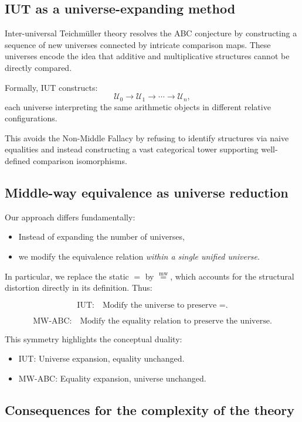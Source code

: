 \documentclass[11pt]{article}
\newcommand{\mweq}{\mathrel{\overset{\mathrm{mw}}{=}}}
\theoremstyle{definition}
\theoremstyle{remark}
\begin{document}
\subsection{IUT as a universe-expanding method}

Inter-universal Teichmüller theory resolves the ABC conjecture by
constructing a sequence of new universes connected by intricate
comparison maps. These universes encode the idea that additive and
multiplicative structures cannot be directly compared.

Formally, IUT constructs:
\[
  \mathcal{U}_{0} \to \mathcal{U}_{1} \to \cdots \to \mathcal{U}_{n},
\]
each universe interpreting the same arithmetic objects in different
relative configurations.

This avoids the Non-Middle Fallacy by refusing to identify structures
via naive equalities and instead constructing a vast categorical tower
supporting well-defined comparison isomorphisms.

\subsection{Middle-way equivalence as universe reduction}

Our approach differs fundamentally:

\begin{itemize}
  \item Instead of expanding the number of universes,
  \item we modify the equivalence relation \emph{within a single unified
        universe}.
\end{itemize}

In particular, we replace the static $=$ by $\mweq$, which accounts for
the structural distortion directly in its definition. Thus:

\[
  \text{IUT:} \quad
     \text{Modify the universe to preserve $=$.}
\]

\[
  \text{MW-ABC:} \quad
     \text{Modify the equality relation to preserve the universe.}
\]

This symmetry highlights the conceptual duality:

\begin{itemize}
  \item IUT: Universe expansion, equality unchanged.
  \item MW-ABC: Equality expansion, universe unchanged.
\end{itemize}

\subsection{Consequences for the complexity of the theory}
\end{document}
